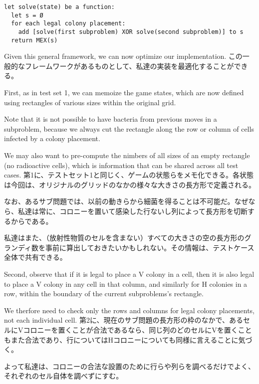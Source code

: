 \documentclass[uplatex,dvipdfmx]{jsarticle} \usepackage{amsmath,amssymb,bm}
\begin{document}
\begin{verbatim}
let solve(state) be a function:
  let s = Ø
  for each legal colony placement:
    add [solve(first subproblem) XOR solve(second subproblem)] to s
  return MEX(s)
\end{verbatim}

\begin{paracol}{2}
Given this general framework, we can now optimize our implementation.
\switchcolumn
この一般的なフレームワークがあるものとして、私達の実装を最適化することができる。
\end{paracol}
\vspace{\baselineskip}
\begin{paracol}{2}
First, as in test set 1, we can memoize the game states, which are now defined using rectangles of various sizes within the original grid.

Note that it is not possible to have bacteria from previous moves in a subproblem, because we always cut the rectangle along the row or column of cells infected by a colony placement.

We may also want to pre-compute the nimbers of all sizes of an empty rectangle (no radioactive cells), which is information that can be shared across all test cases.
\switchcolumn
第1に、テストセット1と同じく、ゲームの状態らをメモ化できる。各状態は今回は、オリジナルのグリッドのなかの様々な大きさの長方形で定義される。

なお、あるサブ問題では、以前の動きらから細菌を得ることは不可能だ。なぜなら、私達は常に、コロニーを置いて感染した行ないし列によって長方形を切断するからである。

私達はまた、（放射性物質のセルを含まない）すべての大きさの空の長方形のグランディ数を事前に算出しておきたいかもしれない。その情報は、テストケース全体で共有できる。
\end{paracol}
\vspace{\baselineskip}
\begin{paracol}{2}
Second, observe that if it is legal to place a V colony in a cell, then it is also legal to place a V colony in any cell in that column, and similarly for H colonies in a row, within the boundary of the current subproblems's rectangle.

We therfore need to check only the rows and columns for legal colony placements, not each individual cell.
\switchcolumn
第2に、現在のサブ問題の長方形の枠のなかで、あるセルにVコロニーを置くことが合法であるなら、同じ列のどのセルにVを置くこともまた合法であり、行についてはHコロニーについても同様に言えることに気づく。

よって私達は、コロニーの合法な設置のために行らや列らを調べるだけでよく、それぞれのセル自体を調べずにすむ。
\end{paracol}
\end{document}

